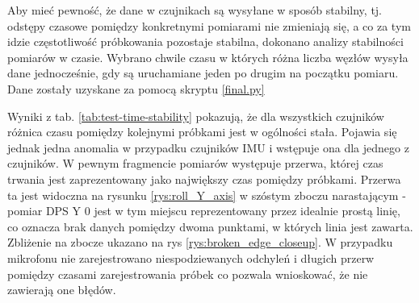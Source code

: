 \documentclass[12pt,oneside,a4paper]{book}
\theoremstyle{break}
\begin{document}
Aby mieć pewność, że dane w czujnikach są wysyłane w sposób stabilny, 
tj. odstępy czasowe pomiędzy konkretnymi pomiarami nie zmieniają 
się, a co za tym idzie częstotliwość próbkowania pozostaje stabilna, 
dokonano analizy stabilności pomiarów w czasie.
Wybrano chwile czasu w których różna liczba węzłów wysyła
dane jednocześnie, gdy są uruchamiane jeden po drugim na początku pomiaru.
Dane zostały uzyskane za pomocą skryptu \ref*{final.py}

\begin{table}[ht]
    \centering
        \caption{Zestawienie wyników pomiarów stabilności czasowej.
        Częstotliwości próbkowania zostały wyliczone na podstawie średnich różnic czasu pomiędzy próbkami.}
        \label{tab:test-time-stability}
\end{table}

Wyniki z tab. \ref{tab:test-time-stability} pokazują, że dla 
wszystkich czujników różnica czasu pomiędzy kolejnymi próbkami 
jest w ogólności stała. Pojawia się jednak jedna anomalia w przypadku
czujników IMU i wstępuje ona dla jednego z czujników. W pewnym 
fragmencie pomiarów występuje przerwa, której czas trwania jest
zaprezentowany jako największy czas pomiędzy próbkami.
Przerwa ta jest widoczna na rysunku \ref*{rys:roll_Y_axis} w 
szóstym zboczu narastającym - pomiar DPS Y 0 jest w tym
miejscu reprezentowany przez idealnie prostą linię, co oznacza
brak danych pomiędzy dwoma punktami, w których linia jest zawarta.
Zbliżenie na zbocze ukazano na rys \ref*{rys:broken_edge_closeup}.
W przypadku mikrofonu nie zarejestrowano niespodziewanych odchyleń i
długich przerw pomiędzy czasami zarejestrowania próbek co pozwala
wnioskować, że nie zawierają one błędów.
\end{document}
